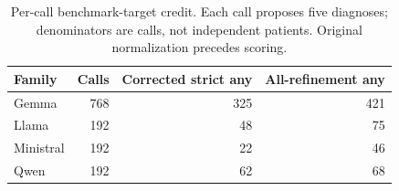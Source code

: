 \begin{table}[ht]\centering\small
\caption{Per-call benchmark-target credit. Each call proposes five diagnoses; denominators are calls, not independent patients. Original normalization precedes scoring.}\label{tab:callquality}
\begin{tabular}{lrrr}\toprule Family & Calls & Corrected strict any & All-refinement any \\ \midrule
Gemma & 768 & 325 & 421 \\
Llama & 192 & 48 & 75 \\
Ministral & 192 & 22 & 46 \\
Qwen & 192 & 62 & 68 \\
\bottomrule\end{tabular}\end{table}
